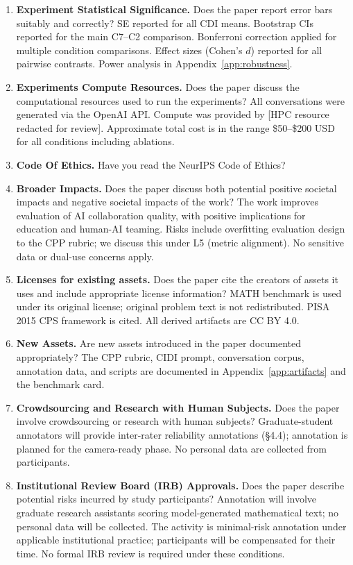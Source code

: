 \documentclass{article}
\begin{document}
\begin{enumerate}
\item \textbf{Experiment Statistical Significance.} Does the paper report error bars suitably and correctly?
\answerYes{} SE reported for all CDI means. Bootstrap CIs reported for the main C7--C2 comparison. Bonferroni correction applied for multiple condition comparisons. Effect sizes (Cohen's $d$) reported for all pairwise contrasts. Power analysis in Appendix~\ref{app:robustness}.

\item \textbf{Experiments Compute Resources.} Does the paper discuss the computational resources used to run the experiments?
\answerYes{} All conversations were generated via the OpenAI API. Compute was provided by [HPC resource redacted for review]. Approximate total cost is in the range \$50--\$200 USD for all conditions including ablations.

\item \textbf{Code Of Ethics.} Have you read the NeurIPS Code of Ethics?
\answerYes{}

\item \textbf{Broader Impacts.} Does the paper discuss both potential positive societal impacts and negative societal impacts of the work?
\answerYes{} The work improves evaluation of AI collaboration quality, with positive implications for education and human-AI teaming. Risks include overfitting evaluation design to the CPP rubric; we discuss this under L5 (metric alignment). No sensitive data or dual-use concerns apply.

\item \textbf{Licenses for existing assets.} Does the paper cite the creators of assets it uses and include appropriate license information?
\answerYes{} MATH benchmark \citep{hendrycks2021math} is used under its original license; original problem text is not redistributed. PISA 2015 CPS framework \citep{pisa2015cps} is cited. All derived artifacts are CC BY 4.0.

\item \textbf{New Assets.} Are new assets introduced in the paper documented appropriately?
\answerYes{} The CPP rubric, CIDI prompt, conversation corpus, annotation data, and scripts are documented in Appendix~\ref{app:artifacts} and the benchmark card.

\item \textbf{Crowdsourcing and Research with Human Subjects.} Does the paper involve crowdsourcing or research with human subjects?
\answerYes{} Graduate-student annotators will provide inter-rater reliability annotations (§4.4); annotation is planned for the camera-ready phase. No personal data are collected from participants.

\item \textbf{Institutional Review Board (IRB) Approvals.} Does the paper describe potential risks incurred by study participants?
\answerYes{} Annotation will involve graduate research assistants scoring model-generated mathematical text; no personal data will be collected. The activity is minimal-risk annotation under applicable institutional practice; participants will be compensated for their time. No formal IRB review is required under these conditions.

\end{enumerate}
\end{document}
